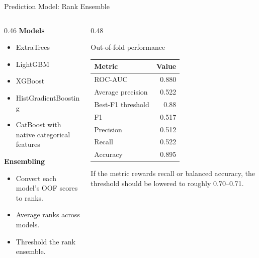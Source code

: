 \documentclass[aspectratio=169,10pt]{beamer}
\begin{document}
\begin{frame}{Prediction Model: Rank Ensemble}
  \begin{columns}[T,totalwidth=\textwidth]
    \begin{column}{0.46\textwidth}
      \textbf{Models}
      \begin{itemize}
        \item ExtraTrees
        \item LightGBM
        \item XGBoost
        \item HistGradientBoosting
        \item CatBoost with native categorical features
      \end{itemize}

      \vspace{0.15cm}
      \textbf{Ensembling}
      \begin{itemize}
        \item Convert each model's OOF scores to ranks.
        \item Average ranks across models.
        \item Threshold the rank ensemble.
      \end{itemize}
    \end{column}

    \begin{column}{0.48\textwidth}
      \begin{block}{Out-of-fold performance}
        \centering
        \begin{tabular}{lr}
          \toprule
          Metric & Value \\
          \midrule
          ROC-AUC & 0.880 \\
          Average precision & 0.522 \\
          Best-F1 threshold & 0.88 \\
          F1 & 0.517 \\
          Precision & 0.512 \\
          Recall & 0.522 \\
          Accuracy & 0.895 \\
          \bottomrule
        \end{tabular}
      \end{block}

      \vspace{0.1cm}
      \small
      If the metric rewards recall or balanced accuracy, the threshold should
      be lowered to roughly 0.70--0.71.
    \end{column}
  \end{columns}
\end{frame}
\end{document}

